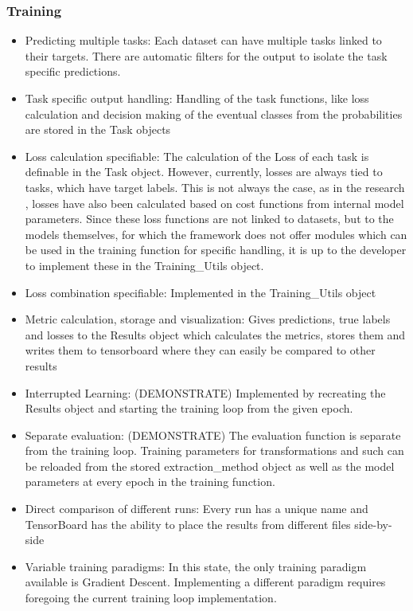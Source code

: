 \subsubsection{Training}
\begin{itemize}
	\item Predicting multiple tasks: Each dataset can have multiple tasks linked to their targets. There are automatic filters for the output to isolate the task specific predictions. 
	\item Task specific output handling: Handling of the task functions, like loss calculation and decision making of the eventual classes from the probabilities are stored in the Task objects 
	\item Loss calculation specifiable: The calculation of the Loss of each task is definable in the Task object. However, currently, losses are always tied to tasks, which have target labels. This is not always the case, as in the research \citep{tagliasacchi2020multi} \citep{wu2020domain}, losses have also been calculated based on cost functions from internal model parameters. Since these loss functions are not linked to datasets, but to the models themselves, for which the framework does not offer modules which can be used in the training function for specific handling, it is up to the developer to implement these in the Training\_Utils object.
	\item Loss combination specifiable: Implemented in the Training\_Utils object
	\item Metric calculation, storage and visualization: Gives predictions, true labels and losses to the Results object which calculates the metrics, stores them and writes them to tensorboard where they can easily be compared to other results
	\item Interrupted Learning: (DEMONSTRATE) Implemented by recreating the Results object and starting the training loop from the given epoch.
	\item Separate evaluation: (DEMONSTRATE) The evaluation function is separate from the training loop. Training parameters for transformations and such can be reloaded from the stored extraction\_method object as well as the model parameters at every epoch in the training function. 
	\item Direct comparison of different runs: Every run has a unique name and TensorBoard has the ability to place the results from different files side-by-side
	\item Variable training paradigms: In this state, the only training paradigm available is Gradient Descent. Implementing a different paradigm requires foregoing the current training loop implementation.
\end{itemize}